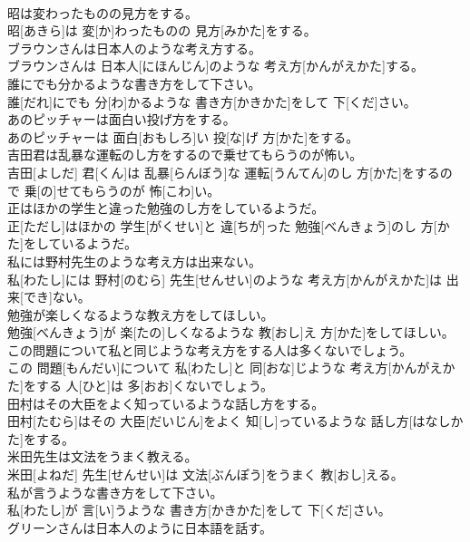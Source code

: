 \documentclass[8pt]{extreport}
\begin{document}
\begin{CJK}{UTF8}{min}
\\	昭は変わったものの見方をする。	
\\	昭[あきら]は 変[か]わったものの 見方[みかた]をする。
\\	ブラウンさんは日本人のような考え方する。	
\\	ブラウンさんは 日本人[にほんじん]のような 考え方[かんがえかた]する。
\\	誰にでも分かるような書き方をして下さい。	
\\	誰[だれ]にでも 分[わ]かるような 書き方[かきかた]をして 下[くだ]さい。
\\	あのピッチャーは面白い投げ方をする。	
\\	あのピッチャーは 面白[おもしろ]い 投[な]げ 方[かた]をする。
\\	吉田君は乱暴な運転のし方をするので乗せてもらうのが怖い。	
\\	吉田[よしだ] 君[くん]は 乱暴[らんぼう]な 運転[うんてん]のし 方[かた]をするので 乗[の]せてもらうのが 怖[こわ]い。
\\	正はほかの学生と違った勉強のし方をしているようだ。	
\\	正[ただし]はほかの 学生[がくせい]と 違[ちが]った 勉強[べんきょう]のし 方[かた]をしているようだ。
\\	私には野村先生のような考え方は出来ない。	
\\	私[わたし]には 野村[のむら] 先生[せんせい]のような 考え方[かんがえかた]は 出来[でき]ない。
\\	勉強が楽しくなるような教え方をしてほしい。	
\\	勉強[べんきょう]が 楽[たの]しくなるような 教[おし]え 方[かた]をしてほしい。
\\	この問題について私と同じような考え方をする人は多くないでしょう。	
\\	この 問題[もんだい]について 私[わたし]と 同[おな]じような 考え方[かんがえかた]をする 人[ひと]は 多[おお]くないでしょう。
\\	田村はその大臣をよく知っているような話し方をする。	
\\	田村[たむら]はその 大臣[だいじん]をよく 知[し]っているような 話し方[はなしかた]をする。
\\	米田先生は文法をうまく教える。	
\\	米田[よねだ] 先生[せんせい]は 文法[ぶんぽう]をうまく 教[おし]える。
\\	私が言うような書き方をして下さい。	
\\	私[わたし]が 言[い]うような 書き方[かきかた]をして 下[くだ]さい。
\\	グリーンさんは日本人のように日本語を話す。	

\end{CJK}
\end{document}

